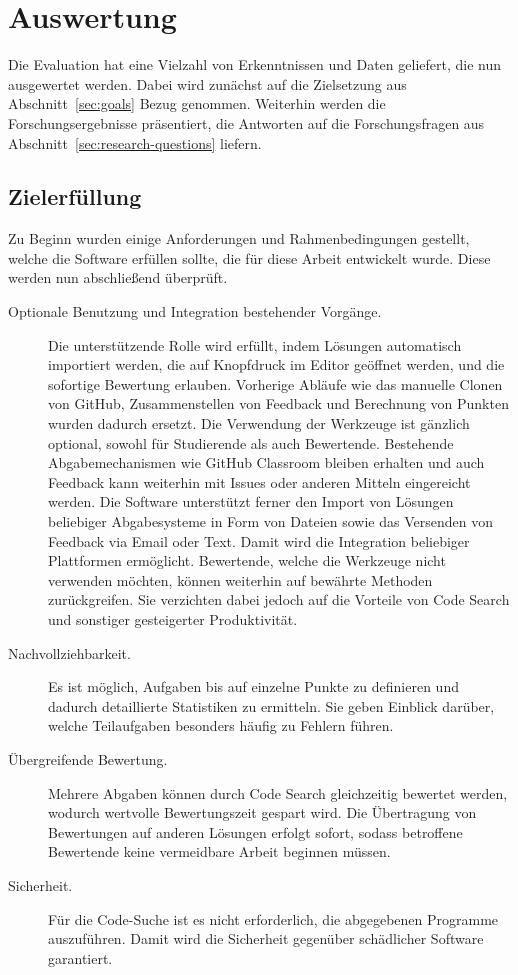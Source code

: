\chapter{Auswertung}\label{ch:results}

Die Evaluation hat eine Vielzahl von Erkenntnissen und Daten geliefert, die nun ausgewertet werden.
Dabei wird zunächst auf die Zielsetzung aus Abschnitt~\ref{sec:goals} Bezug genommen.
Weiterhin werden die Forschungsergebnisse präsentiert, die Antworten auf die Forschungsfragen aus Abschnitt~\ref{sec:research-questions} liefern.

\section{Zielerfüllung}\label{sec:goals-reached}

Zu Beginn wurden einige Anforderungen und Rahmenbedingungen gestellt, welche die Software erfüllen sollte, die für diese Arbeit entwickelt wurde.
Diese werden nun abschließend überprüft.

\begin{description}
    \item[Optionale Benutzung und Integration bestehender Vorgänge.]
    Die unterstützende Rolle wird erfüllt, indem Lösungen automatisch importiert werden, die auf Knopfdruck im Editor geöffnet werden, und die sofortige Bewertung erlauben.
    Vorherige Abläufe wie das manuelle Clonen von GitHub, Zusammenstellen von Feedback und Berechnung von Punkten wurden dadurch ersetzt.
    Die Verwendung der Werkzeuge ist gänzlich optional, sowohl für Studierende als auch Bewertende.
    Bestehende Abgabemechanismen wie GitHub Classroom bleiben erhalten und auch Feedback kann weiterhin mit Issues oder anderen Mitteln eingereicht werden.
    Die Software unterstützt ferner den Import von Lösungen beliebiger Abgabesysteme in Form von Dateien sowie das Versenden von Feedback via Email oder Text.
    Damit wird die Integration beliebiger Plattformen ermöglicht.
    Bewertende, welche die Werkzeuge nicht verwenden möchten, können weiterhin auf bewährte Methoden zurückgreifen.
    Sie verzichten dabei jedoch auf die Vorteile von Code Search und sonstiger gesteigerter Produktivität.
    \item[Nachvollziehbarkeit.]
    Es ist möglich, Aufgaben bis auf einzelne Punkte zu definieren und dadurch detaillierte Statistiken zu ermitteln.
    Sie geben Einblick darüber, welche Teilaufgaben besonders häufig zu Fehlern führen.
    \item[Übergreifende Bewertung.]
    Mehrere Abgaben können durch Code Search gleichzeitig bewertet werden, wodurch wertvolle Bewertungszeit gespart wird.
    Die Übertragung von Bewertungen auf anderen Lösungen erfolgt sofort, sodass betroffene Bewertende keine vermeidbare Arbeit beginnen müssen.
    \item[Sicherheit.]
    Für die Code-Suche ist es nicht erforderlich, die abgegebenen Programme auszuführen.
    Damit wird die Sicherheit gegenüber schädlicher Software garantiert.
\end{description}

